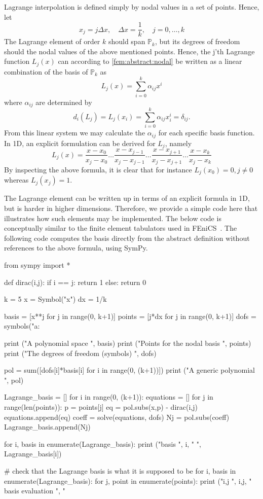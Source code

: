 \begin{exmp}
\label{lagrange:element}
Lagrange interpolation is defined simply by nodal values in a set of points. Hence, 
let 
\[
x_j = j \Delta x, \quad \Delta x = \frac{1}{k}, \quad  j= 0, \dots, k 
\]
The Lagrange element of order $k$ should span $\mathbb{P}_k$, but its degrees of freedom should the nodal values of the above mentioned points. Hence,   
the j'th Lagrange function $L_j(x)$ can according to \eqref{fem:abstract:nodal} be written as a linear combination of the basis of $\mathbb{P}_k$ as 
\[ 
L_j(x) = \sum_{i=0}^k \alpha_{ij} x^i 
\]
where $\alpha_{ij}$ are determined by 
\[ 
d_i(L_j) = L_j(x_i) = \sum_{i=0}^k \alpha_{ij} x^i_i = \delta_{ij} . 
\]
From this linear system we may calculate the $\alpha_{ij}$ for each specific basis function. 
In 1D, an explicit formulation can be derived for $L_j$, namely 
\[
L_j(x) = \frac{x-x_0}{x_j-x_0} \ldots \frac{x-x_{j-1}}{x_j-x_{j-1}} \ldots \frac{x-x_{j+1}}{x_j-x_{j+1}} \ldots \frac{x-x_k}{x_j-x_k}  
\]
By inspecting the above formula, it is clear that for instance $L_j(x_0) = 0, j\not= 0$ whereas  $L_j(x_j) = 1$.  
\end{exmp}
The Lagrange element  can be written up in terms of an explicit formula in 1D, but is harder in higher dimensions.
Therefore, we provide a simple code here that illustrates how such elements may be implemented. 
The below code is conceptually similar to the finite element tabulators used in FEniCS~\cite{kirby2012constructing,kirby2012fiat,alnaes2012syfi}.   
The following code computes the basis directly from the abstract definition without references to the above formula, using SymPy.  
\begin{python}
from sympy import * 

def dirac(i,j): 
  if i == j: return 1 
  else: return 0 

k = 5  
x = Symbol("x") 
dx = 1/k 

basis = [x**j for j in range(0, k+1)] 
points = [j*dx for j in range(0, k+1)] 
dofs = symbols("a:%

print ("A polynomial space         ", basis) 
print ("Points for the nodal basis ", points) 
print ("The degrees of freedom (symbols) ", dofs) 

pol = sum([dofs[i]*basis[i] for i in range(0, (k+1))])   
print ("A generic polynomial       ", pol)

Lagrange_basis = []
for i in range(0, (k+1)): 
  equations = []
  for j in range(len(points)):  
    p = points[j]
    eq = pol.subs(x,p) - dirac(i,j) 
    equations.append(eq)
  coeff = solve(equations, dofs) 
  Nj = pol.subs(coeff)
  Lagrange_basis.append(Nj) 

for i, basis in enumerate(Lagrange_basis): 
    print ("basis ", i, " ", Lagrange_basis[i]) 

# check that the Lagrange basis is what it is supposed to be 
for i, basis in enumerate(Lagrange_basis): 
    for j, point in enumerate(points): 
        print ("i,j ", i,j, " basis evaluation ",  "%


\end{python}
